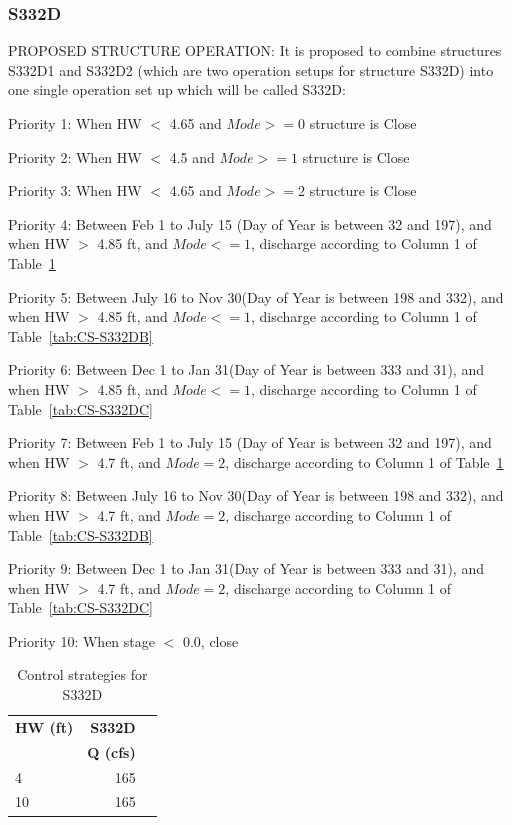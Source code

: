 \subsubsection{S332D}

PROPOSED STRUCTURE OPERATION: It is proposed to combine structures S332D1 and S332D2 (which are two operation setups for structure S332D) into one single operation set up which will be called S332D:

\begin{packed_items}
\item Priority 1: When HW $<$ 4.65 and $Mode>=0$ structure is Close
\item Priority 2: When HW $<$ 4.5 and $Mode>=1$ structure is Close
\item Priority 3: When HW $<$ 4.65 and $Mode>=2$ structure is Close
\item Priority 4: Between Feb 1 to July 15 (Day of Year is between 32 and 197), and when HW $>$ 4.85 ft, and $Mode<=1$,  discharge according to Column 1 of Table~\ref{tab:CS-S332DA}
\item Priority 5: Between July 16 to Nov 30(Day of Year is between 198 and 332), and when HW $>$ 4.85 ft, and $Mode<=1$,  discharge according to Column 1 of Table~\ref{tab:CS-S332DB}
\item Priority 6: Between Dec 1 to Jan 31(Day of Year is between 333 and 31), and when HW $>$ 4.85 ft, and $Mode<=1$,  discharge according to Column 1 of Table~\ref{tab:CS-S332DC}
\item Priority 7: Between Feb 1 to July 15 (Day of Year is between 32 and 197), and when HW $>$ 4.7 ft, and $Mode=2$,  discharge according to Column 1 of Table~\ref{tab:CS-S332DA}
\item Priority 8: Between July 16 to Nov 30(Day of Year is between 198 and 332), and when HW $>$ 4.7 ft, and $Mode=2$,  discharge according to Column 1 of Table~\ref{tab:CS-S332DB}
\item Priority 9: Between Dec 1 to Jan 31(Day of Year is between 333 and 31), and when HW $>$ 4.7 ft, and $Mode=2$,  discharge according to Column 1 of Table~\ref{tab:CS-S332DC}
\item Priority 10: When stage $<$ 0.0, close
\end{packed_items}

\footnotesize
\begin{table}[!h]
\centering
\caption{Control strategies for S332D}
\label{tab:CS-S332DA}
\begin{tabular}{l|rr}
\hline
\textbf{HW (ft)} &  \textbf{S332D} \\
\textbf{       } & \textbf{Q (cfs)} \\
\hline
4	     &    165  \\
10	     &    165  \\
\hline
\end{tabular}
\end{table}
\normalsize

